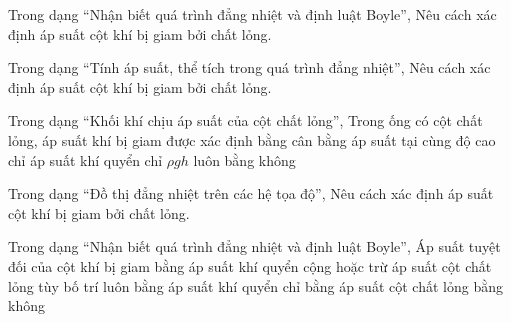 \begin{ex}
Trong dạng “Nhận biết quá trình đẳng nhiệt và định luật Boyle”, Nêu cách xác định áp suất cột khí bị giam bởi chất lỏng.
\choiceTF

\end{ex}

\begin{ex}
Trong dạng “Tính áp suất, thể tích trong quá trình đẳng nhiệt”, Nêu cách xác định áp suất cột khí bị giam bởi chất lỏng.
\choiceTF

\end{ex}

\begin{ex}
Trong dạng “Khối khí chịu áp suất của cột chất lỏng”, Trong ống có cột chất lỏng, áp suất khí bị giam được xác định bằng
\choice
{\True cân bằng áp suất tại cùng độ cao}
{chỉ áp suất khí quyển}
{chỉ $\rho gh$}
{luôn bằng không}
\end{ex}

\begin{ex}
Trong dạng “Đồ thị đẳng nhiệt trên các hệ tọa độ”, Nêu cách xác định áp suất cột khí bị giam bởi chất lỏng.
\choiceTF

\end{ex}

\begin{ex}
Trong dạng “Nhận biết quá trình đẳng nhiệt và định luật Boyle”, Áp suất tuyệt đối của cột khí bị giam bằng
\choice
{\True áp suất khí quyển cộng hoặc trừ áp suất cột chất lỏng tùy bố trí}
{luôn bằng áp suất khí quyển}
{chỉ bằng áp suất cột chất lỏng}
{bằng không}
\end{ex}

